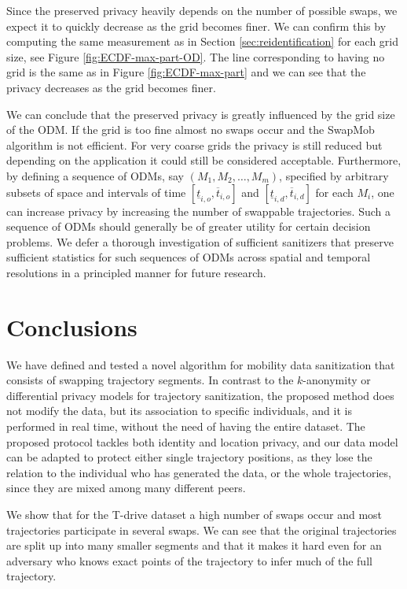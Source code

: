 Since the preserved privacy heavily depends on the number of possible
swaps, we expect it to quickly decrease as the grid becomes finer. We
can confirm this by computing the same measurement as in Section
\ref{sec:reidentification} for each grid size, see Figure
\ref{fig:ECDF-max-part-OD}. The line corresponding to having no grid
is the same as in Figure \ref{fig:ECDF-max-part} and we can see that
the privacy decreases as the grid becomes finer.

We can conclude that the preserved privacy is greatly influenced by
the grid size of the ODM. If the grid is too fine almost no swaps occur
and the SwapMob algorithm is not efficient. For very coarse grids the
privacy is still reduced but depending on the application it could still
be considered acceptable.  
Furthermore, by defining a sequence of ODMs, say $(M_1,M_2,\ldots,M_m)$, specified by arbitrary subsets of space 
and intervals of time $[\underline{t}_{i,o},\overline{t}_{i,o}]$ and $[\underline{t}_{i,d},\overline{t}_{i,d}]$ for each $M_i$, one can increase privacy by increasing the number of swappable trajectories. Such a sequence of ODMs should generally be of greater utility for certain decision problems. We defer a thorough investigation of sufficient sanitizers that preserve sufficient statistics for such sequences of ODMs across spatial and temporal resolutions in a principled manner for future research.  

\section{Conclusions}\label{Sec:conclusions}

We have defined and tested a novel algorithm for mobility data \linebreak
sanitization that consists of swapping trajectory segments. In contrast to the $k$-anonymity or differential privacy models for trajectory sanitization, the proposed method does not modify the data, but its association to specific individuals, and it is performed in real time, without the need of having the entire dataset.
The proposed protocol tackles both identity and location privacy,
and our data model can be adapted to protect either single trajectory positions, as they lose the relation to the individual who has generated the data, or the whole trajectories, since they are mixed among many different peers.

We show that for the T-drive dataset a high number of swaps occur and
most trajectories participate in several swaps. We can see that the
original trajectories are split up into many smaller segments and that
it makes it hard even for an adversary who knows exact points of the
trajectory to infer much of the full trajectory. 

